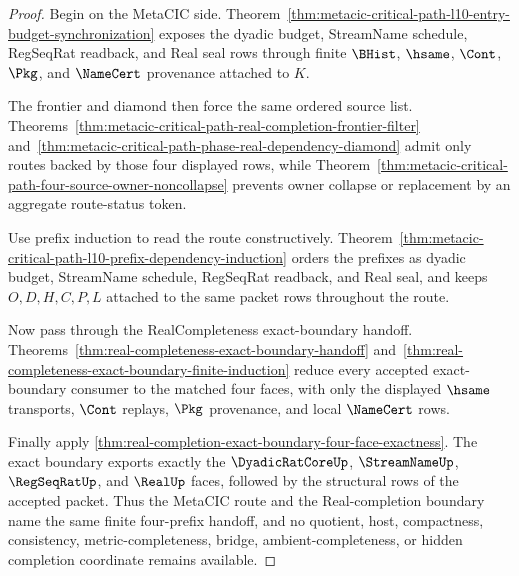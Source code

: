 \begin{proof}
Begin on the MetaCIC side. Theorem~\ref{thm:metacic-critical-path-l10-entry-budget-synchronization} exposes the dyadic budget, StreamName schedule, RegSeqRat readback, and Real seal rows through finite $\BHist$, $\hsame$, $\Cont$, $\Pkg$, and $\NameCert$ provenance attached to $K$.

The frontier and diamond then force the same ordered source list. Theorems~\ref{thm:metacic-critical-path-real-completion-frontier-filter} and~\ref{thm:metacic-critical-path-phase-real-dependency-diamond} admit only routes backed by those four displayed rows, while Theorem~\ref{thm:metacic-critical-path-four-source-owner-noncollapse} prevents owner collapse or replacement by an aggregate route-status token.

Use prefix induction to read the route constructively. Theorem~\ref{thm:metacic-critical-path-l10-prefix-dependency-induction} orders the prefixes as dyadic budget, StreamName schedule, RegSeqRat readback, and Real seal, and keeps $O,D,H,C,P,L$ attached to the same packet rows throughout the route.

Now pass through the RealCompleteness exact-boundary handoff. Theorems~\ref{thm:real-completeness-exact-boundary-handoff} and~\ref{thm:real-completeness-exact-boundary-finite-induction} reduce every accepted exact-boundary consumer to the matched four faces, with only the displayed $\hsame$ transports, $\Cont$ replays, $\Pkg$ provenance, and local $\NameCert$ rows.

Finally apply \autoref{thm:real-completion-exact-boundary-four-face-exactness}. The exact boundary exports exactly the $\DyadicRatCoreUp$, $\StreamNameUp$, $\RegSeqRatUp$, and $\RealUp$ faces, followed by the structural rows of the accepted packet. Thus the MetaCIC route and the Real-completion boundary name the same finite four-prefix handoff, and no quotient, host, compactness, consistency, metric-completeness, bridge, ambient-completeness, or hidden completion coordinate remains available.
\end{proof}

